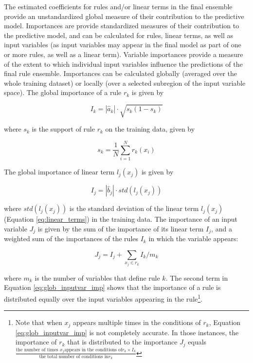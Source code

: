 \documentclass[nobf,doc]{apa}
\begin{document}
The estimated coefficients for rules and/or linear terms in the final ensemble provide an unstandardized global measure of their contribution to the predictive model. Importances are provide standardized measures of their contribution to the predictive model, and can be calculated for rules, linear terms, as well as input variables (as input variables may appear in the final model as part of one or more rules, as well as a linear term). Variable importances provide a measure of the extent to which individual input variables influence the predictions of the final rule ensemble. Importances can be calculated globally (averaged over the whole training dataset) or locally (over a selected subregion of the input variable space). The global importance of a rule $r_k$ is given by 

\begin{equation}
	I_k = |\hat{a}_k| \cdot \sqrt{s_k(1-s_k)} %
	\label{eq:global_rule_imp}
\end{equation}

where $s_k$ is the support of rule $r_k$ on the training data, given by 

\begin{equation}
	s_k = \frac{1}{N} \sum^{N}_{i=1}{r_k(x_i)}
	\label{eq:global_support}
\end{equation}

The global importance of linear term $l_j(x_j)$ is given by

\begin{equation}
	I_j = |\hat{b}_j| \cdot \textit{std}(l_j(x_j)) %
	\label{eq:global_linear_imp}
\end{equation}

where $std(l_j(x_j))$ is the standard deviation of the linear term $l_j(x_j)$ (Equation \ref{eq:linear_terms}) in the training data. The importance of an input variable $J_j$ is given by the sum of the importance of its linear term $I_j$, and a weighted sum of the importances of the rules $I_k$ in which the variable appears:

\begin{equation}
	J_j = I_j + \sum_{x_j \in r_k}{I_k / m_k}
	\label{eq:glob_inputvar_imp}
\end{equation}

where $m_k$ is the number of variables that define rule $k$. The second term in Equation \ref{eq:glob_inputvar_imp} shows that the importance of a rule is distributed equally over the input variables appearing in the rule\footnote{Note that when $x_j$ appears multiple times in the conditions of $r_k$, Equation \ref{eq:glob_inputvar_imp} is not completely accurate. In those instances, the importance of $r_k$ that is distributed to the importance $J_j$ equals $\frac{\textrm{the number of times } x_j \textrm{appears in the conditions of} r_k \times I_k}{\textrm{the total number of conditions in} r_k}$}.
\end{document}
